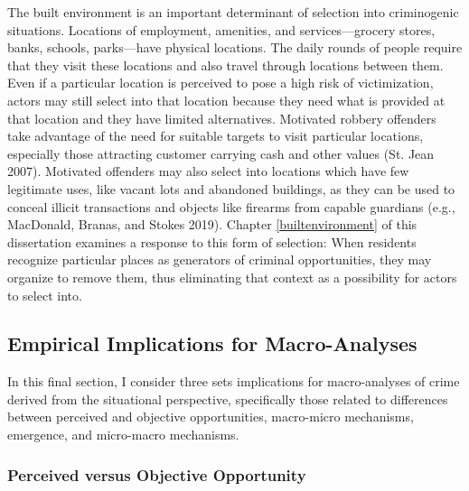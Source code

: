 \documentclass [11pt, proquest] {uwthesis}[2015/03/03]
\begin{document}
The built environment is an important determinant of selection into criminogenic situations. Locations of employment, amenities, and services---grocery stores, banks, schools, parks---have physical locations. The daily rounds of people require that they visit these locations and also travel through locations between them. Even if a particular location is perceived to pose a high risk of victimization, actors may still select into that location because they need what is provided at that location and they have limited alternatives. Motivated robbery offenders take advantage of the need for suitable targets to visit particular locations, especially those attracting customer carrying cash and other values (St. Jean 2007). Motivated offenders may also select into locations which have few legitimate uses, like vacant lots and abandoned buildings, as they can be used to conceal illicit transactions and objects like firearms from capable guardians (e.g., MacDonald, Branas, and Stokes 2019). Chapter \ref{builtenvironment} of this dissertation examines a response to this form of selection: When residents recognize particular places as generators of criminal opportunities, they may organize to remove them, thus eliminating that context as a possibility for actors to select into.

\hypertarget{empirical-implications-for-macro-analyses}{%
\subsection{Empirical Implications for Macro-Analyses}\label{empirical-implications-for-macro-analyses}}

In this final section, I consider three sets implications for macro-analyses of crime derived from the situational perspective, specifically those related to differences between perceived and objective opportunities, macro-micro mechanisms, emergence, and micro-macro mechanisms.

\hypertarget{perceived-versus-objective-opportunity}{%
\subsubsection{Perceived versus Objective Opportunity}\label{perceived-versus-objective-opportunity}}
\end{document}

